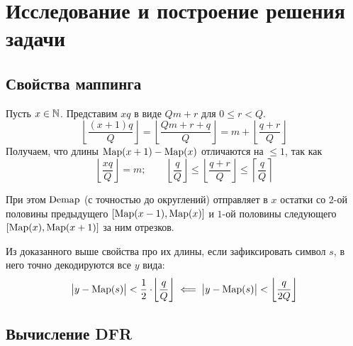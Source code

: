 \section{Исследование и построение решения задачи}
\label{sec:Chapter4} 


\subsection{Свойства маппинга}

Пусть $x \in \mathbb{N}$. Представим $xq$ в виде $Qm+r$ для $0 \leq r < Q$.
\begin{equation}
	\left\lfloor\frac{(x+1)q}{Q}\right\rfloor = \left\lfloor\frac{Qm+r+q}{Q}\right\rfloor = m+\left\lfloor\frac{q+r}{Q}\right\rfloor
\end{equation}
Получаем, что длины $\operatorname{Map}(x+1)-\operatorname{Map}(x)$ отличаются на $\leq 1$, так как
\begin{equation}
	\left\lfloor\frac{xq}{Q}\right\rfloor = m; \qquad \left\lfloor\frac{q}{Q}\right\rfloor \leq \left\lfloor\frac{q+r}{Q}\right\rfloor \leq \left\lceil\frac{q}{Q}\right\rceil
\end{equation}

При этом $\operatorname{Demap}$ (с точностью до округлений) отправляет в $x$ остатки со $2$-ой половины предыдущего $[\operatorname{Map}(x-1), \operatorname{Map}(x)]$ и $1$-ой половины следующего $[\operatorname{Map}(x), \operatorname{Map}(x+1)]$ за ним отрезков.

Из доказанного выше свойства про их длины, если зафиксировать символ $s$, в него точно декодируются все $y$ вида:
\begin{equation}
	\bigl|y-\operatorname{Map}(s)\bigr| < \frac12\cdot\!\left\lfloor\frac{q}{Q}\right\rfloor \;\Longleftarrow\; \bigl|y-\operatorname{Map}(s)\bigr| < \left\lfloor\frac{q}{2Q}\right\rfloor
\end{equation}


\subsection{Вычисление DFR}

